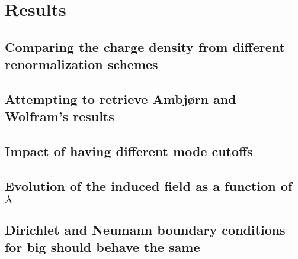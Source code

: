\chapter{Results}

\section{Comparing the charge density from different renormalization schemes}

\section{Attempting to retrieve Ambj\o rn and Wolfram's results}

\section{Impact of having different mode cutoffs}

\section{Evolution of the induced field as a function of $\lambda$}

\section{Dirichlet and Neumann boundary conditions for big should behave the same}
